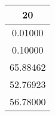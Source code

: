 \begin{tabular}{c}
\hline \hline
      20 \\
\hline \hline
 0.01000 \\
 0.10000 \\
65.88462 \\
52.76923 \\
56.78000 \\
\hline \hline
\end{tabular}
